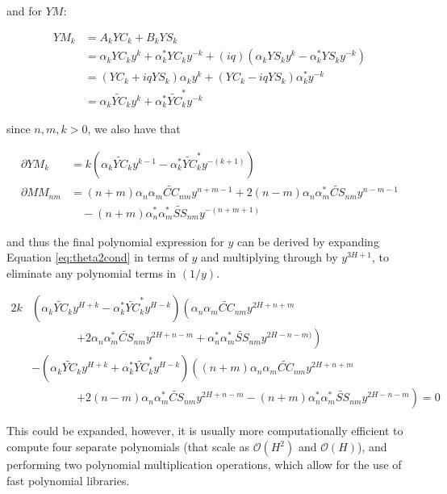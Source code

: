 \documentclass[apj]{emulateapj}
\newcommand{\bigO}{\mathcal{O}}
\newcommand{\YCt}{\widetilde{YC}}
\newcommand{\CCt}{\widetilde{CC}}
\newcommand{\CSt}{\widetilde{CS}}
\newcommand{\SSt}{\widetilde{SS}}
\begin{document}
\begin{appendix}
and for $YM$:

\begin{align}
YM_{k} &= A_kYC_k + B_kYS_k\\
        &= \alpha_kYC_ky^k + \alpha_k^{*}YC_ky^{-k} + (iq)\left(\alpha_kYS_ky^k - \alpha^{*}_kYS_ky^{-k}\right)\\
        &= (YC_k + iqYS_k)\alpha_ky^k + (YC_k - iqYS_k)\alpha^{*}_ky^{-k}\\
        &= \alpha_k\YCt_k y^k + \alpha^{*}_k\YCt_k^{*} y^{-k}
\end{align}

since $n,m,k > 0$, we also have that

\begin{align}
\partial YM_k &= k\left(\alpha_k\YCt_k y^{k-1} - \alpha^{*}_k\YCt_k^{*} y^{-(k+1)}\right)\\
\partial MM_{nm} &= (n+m)\alpha_n\alpha_m\CCt_{nm}y^{n+m-1} + 2(n-m)\alpha_n\alpha^{*}_m\CSt_{nm}y^{n-m-1} \\
                &\quad- (n+m)\alpha^{*}_n\alpha^{*}_m\SSt_{nm}y^{-(n+m+1)}
\end{align}

and thus the final polynomial expression for $y$ can be derived by expanding Equation \ref{eq:theta2cond} in terms of $y$ and multiplying through by
 $y^{3H+1}$, to eliminate any polynomial terms in $(1/y)$.

\begin{align}
2k&\left(\alpha_k\YCt_k y^{H+k} - \alpha^{*}_k\YCt_k^{*} y^{H-k}\right)\left(\alpha_n\alpha_m\CCt_{nm}y^{2H+n+m} \right.\\
&\qquad\qquad\left. + 2\alpha_n\alpha^{*}_m\CSt_{nm}y^{2H + n - m} + \alpha^{*}_n\alpha^{*}_m\SSt_{nm}y^{2H-n-m)}\right)\\
& - \left(\alpha_k\YCt_k y^{H+k} + \alpha^{*}_k\YCt_k^{*} y^{H-k}\right)\left((n+m)\alpha_n\alpha_m\CCt_{nm}y^{2H+n+m} \right.\\
&\qquad\qquad\left. + 2(n-m)\alpha_n\alpha^{*}_m\CSt_{nm}y^{2H+n-m} - (n+m)\alpha^{*}_n\alpha^{*}_m\SSt_{nm}y^{2H-n-m}\right) = 0
\end{align}

This could be expanded, however, it is usually more computationally efficient to compute four separate polynomials (that scale as $\bigO(H^2)$ and $\bigO(H)$),
and performing two polynomial multiplication operations, which allow for the use of fast polynomial libraries.


\end{appendix}


\end{document}
